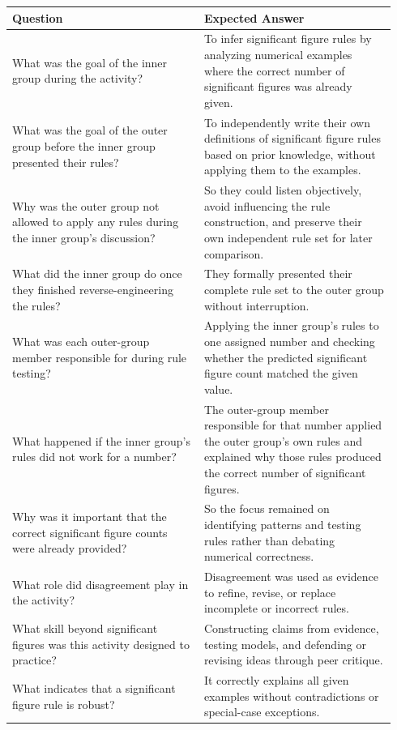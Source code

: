 \documentclass{article}
\begin{document}
\begin{center}
\begin{tabular}{|p{0.47\linewidth}|p{0.47\linewidth}|}
\hline
\textbf{Question} & \textbf{Expected Answer} \\
\hline
What was the goal of the inner group during the activity? &
To infer significant figure rules by analyzing numerical examples where the correct number of significant figures was already given. \\
\hline
What was the goal of the outer group before the inner group presented their rules? &
To independently write their own definitions of significant figure rules based on prior knowledge, without applying them to the examples. \\
\hline
Why was the outer group not allowed to apply any rules during the inner group’s discussion? &
So they could listen objectively, avoid influencing the rule construction, and preserve their own independent rule set for later comparison. \\
\hline
What did the inner group do once they finished reverse-engineering the rules? &
They formally presented their complete rule set to the outer group without interruption. \\
\hline
What was each outer-group member responsible for during rule testing? &
Applying the inner group’s rules to one assigned number and checking whether the predicted significant figure count matched the given value. \\
\hline
What happened if the inner group’s rules did not work for a number? &
The outer-group member responsible for that number applied the outer group’s own rules and explained why those rules produced the correct number of significant figures. \\
\hline
Why was it important that the correct significant figure counts were already provided? &
So the focus remained on identifying patterns and testing rules rather than debating numerical correctness. \\
\hline
What role did disagreement play in the activity? &
Disagreement was used as evidence to refine, revise, or replace incomplete or incorrect rules. \\
\hline
What skill beyond significant figures was this activity designed to practice? &
Constructing claims from evidence, testing models, and defending or revising ideas through peer critique. \\
\hline
What indicates that a significant figure rule is robust? &
It correctly explains all given examples without contradictions or special-case exceptions. \\
\hline
\end{tabular}
\end{center}
\newpage
\end{document}
